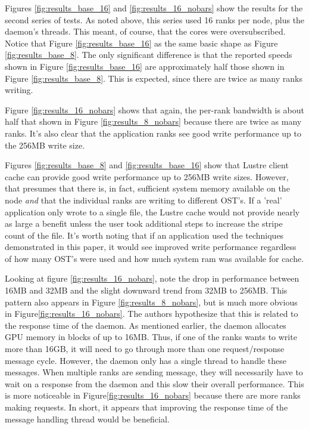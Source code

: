 
Figures \ref{fig:results_base_16} and \ref{fig:results_16_nobars} show the results for the second series of tests.  As noted above, this series used 16 ranks per node, plus the daemon's threads.  This meant, of course, that the cores were oversubscribed.  Notice that Figure \ref{fig:results_base_16} as the same basic shape as Figure \ref{fig:results_base_8}.  The only significant difference is that the reported speeds shown in Figure \ref{fig:results_base_16} are approximately half those shown in Figure \ref{fig:results_base_8}.  This is expected, since there are twice as many ranks writing.

Figure \ref{fig:results_16_nobars} shows that again, the per-rank bandwidth is about half that shown in Figure \ref{fig:results_8_nobars} because there are twice as many ranks.  It's also clear that the application ranks see good write performance up to the 256MB write size. 

Figures \ref{fig:results_base_8} and \ref{fig:results_base_16} show that Lustre client cache can provide good write performance up to 256MB write sizes.  However, that presumes that there is, in fact, sufficient system memory available on the node \emph{and} that the individual ranks are writing to different OST's.  If a 'real' application only wrote to a single file, the Lustre cache would not provide nearly as large a benefit unless the user took additional steps to increase the stripe count of the file.  It's worth noting that if an application used the techniques demonstrated in this paper, it would see improved write performance regardless of how many OST's were used and how much system ram was available for cache.

Looking at figure \ref{fig:results_16_nobars}, note the drop in performance between 16MB and 32MB and the slight downward trend from 32MB to 256MB.  This pattern also appears in Figure \ref{fig:results_8_nobars}, but is much more obvious in Figure\ref{fig:results_16_nobars}.  The authors hypothesize that this is related to the response time of the daemon.  As mentioned earlier, the daemon allocates GPU memory in blocks of up to 16MB.  Thus, if one of the ranks wants to write more than 16GB, it will need to go through more than one request/response message cycle.  However, the daemon only has a single thread to handle these messages.  When multiple ranks are sending message, they will necessarily have to wait on a response from the daemon and this slow their overall performance.  This is more noticeable in Figure\ref{fig:results_16_nobars} because there are more ranks making requests.
In short, it appears that improving the response time of the message handling thread would be beneficial.
